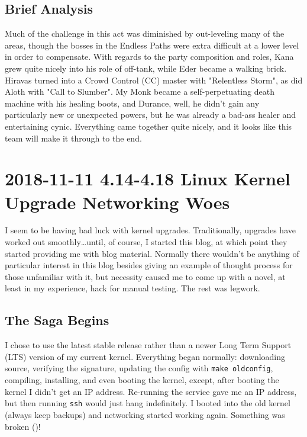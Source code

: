 \documentclass{article}
\begin{document}
\subsection{Brief Analysis}
Much of the challenge in this act was diminished by out-leveling many of the areas, though the bosses in the Endless Paths were extra difficult at a lower level in order to compensate.  With regards to the party composition and roles, Kana grew quite nicely into his role of off-tank, while Eder became a walking brick.  Hiravas turned into a Crowd Control (CC) master with "Relentless Storm", as did Aloth with "Call to Slumber".  My Monk became a self-perpetuating death machine with his healing boots, and Durance, well, he didn't gain any particularly new or unexpected powers, but he was already a bad-ass healer and entertaining cynic.  Everything came together quite nicely, and it looks like this team will make it through to the end.


\section{2018-11-11 4.14-4.18 Linux Kernel Upgrade Networking Woes}
I seem to be having bad luck with kernel upgrades.  Traditionally, upgrades have worked out smoothly\ldots until, of course, I started this blog, at which point they started providing me with blog material.  Normally there wouldn't be anything of particular interest in this blog besides giving an example of thought process for those unfamiliar with it, but necessity caused me to come up with a novel, at least in my experience, hack for manual testing.  The rest was legwork.

\subsection{The Saga Begins}
I chose to use the latest stable release rather than a newer Long Term Support (LTS) version of my current kernel.  Everything began normally: downloading source, verifying the signature, updating the config with \texttt{make oldconfig}, compiling, installing, and even booting the kernel, except, after booting the kernel I didn't get an IP address.  Re-running the service gave me an IP address, but then running \texttt{ssh} would just hang indefinitely.  I booted into the old kernel (always keep backups) and networking started working again.  Something was broken ()!
\end{document}
